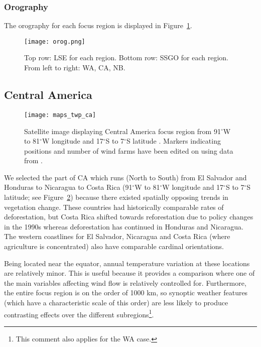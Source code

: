 \subsubsection{Orography}

The orography for each focus region is displayed in Figure~\ref{fig:orog}.

\begin{figure}[!ht]
	\centering
	\texttt{[image: orog.png]}
	\caption[Orography for all focus regions]{Top row: \acf{LSE} for each region. Bottom row: \acf{SSGO} for each region. From left to right: \acl{WA}, \acl{CA}, \acl{NB}.}
	\label{fig:orog}
\end{figure}

\subsection{Central America}

\begin{figure}[!ht]
	\centering
	\texttt{[image: maps\_twp\_ca]}
	\caption[Central America Map]{Satellite image displaying Central America focus region from 91$^\circ$W to 81$^\circ$W longitude and 17$^\circ$S to 7$^\circ$S latitude \citep{maps_ca}. Markers indicating positions and number of wind farms have been edited on using data from \citep{twp_hd, twp_nc, twp_cr}.}
	\label{fig:maps_twp_ca}
\end{figure}

We selected the part of \ac{CA} which runs (North to South) from El Salvador and Honduras to Nicaragua to Costa Rica (91$^\circ$W to 81$^\circ$W longitude and 17$^\circ$S to 7$^\circ$S latitude; see Figure~\ref{fig:maps_twp_ca}) because there existed spatially opposing trends in vegetation change. These countries had historically comparable rates of deforestation, but Costa Rica shifted towards reforestation due to policy changes in the 1990s whereas deforestation has continued in Honduras and Nicaragua. The western coastlines for El Salvador, Nicaragua and Costa Rica (where agriculture is concentrated) also have comparable cardinal orientations.

Being located near the equator, annual temperature variation at these locations are relatively minor. This is useful because it provides a comparison where one of the main variables affecting wind flow is relatively controlled for. Furthermore, the entire focus region is on the order of 1000 km, so synoptic weather features (which have a characteristic scale of this order) are less likely to produce contrasting effects over the different subregions\footnote{This comment also applies for the \ac{WA} case.}.

